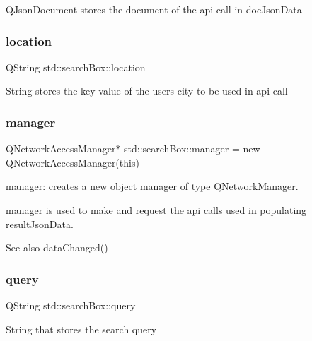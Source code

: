 Q\+Json\+Document stores the document of the api call in doc\+Json\+Data \mbox{\label{classstd_1_1searchBox_a02d951e4331a6b3a598b59d997a6564e}} 
\subsubsection{\texorpdfstring{location}{location}}
{\footnotesize\ttfamily Q\+String std\+::search\+Box\+::location\hspace{0.3cm}{\ttfamily [private]}}

String stores the key value of the users city to be used in api call \mbox{\label{classstd_1_1searchBox_afd76f8227036d0d42122cd152bca52f2}} 
\subsubsection{\texorpdfstring{manager}{manager}}
{\footnotesize\ttfamily Q\+Network\+Access\+Manager$\ast$ std\+::search\+Box\+::manager = new Q\+Network\+Access\+Manager(this)}



manager\+: creates a new object manager of type Q\+Network\+Manager. 

manager is used to make and request the api calls used in populating result\+Json\+Data. \begin{DoxySeeAlso}{See also}
data\+Changed() 
\end{DoxySeeAlso}
\mbox{\label{classstd_1_1searchBox_aea961f663dcd293eaa5ba38828f730e4}} 
\subsubsection{\texorpdfstring{query}{query}}
{\footnotesize\ttfamily Q\+String std\+::search\+Box\+::query\hspace{0.3cm}{\ttfamily [private]}}

String that stores the search query \mbox{\label{classstd_1_1searchBox_a3c8548638d130a68df6b3ae74a1b1048}} 
